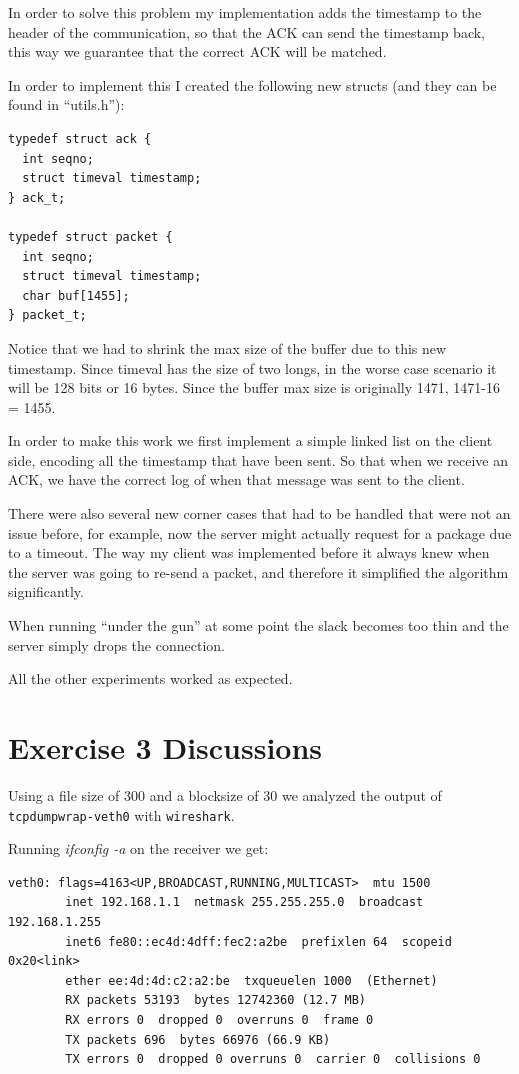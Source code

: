 \documentclass[paper=a4, fontsize=11pt]{scrartcl}
\numberwithin{equation}{section}		%
\numberwithin{figure}{section}			%
\numberwithin{table}{section}				%
\begin{document}
In order to solve this problem my implementation adds the timestamp
to the header of the communication, so that the ACK can send the timestamp
back, this way we guarantee that the correct ACK will be matched.

In order to implement this I created the following new structs (and they can be found in ``utils.h''):

\begin{lstlisting}
typedef struct ack {
  int seqno;
  struct timeval timestamp;
} ack_t;

typedef struct packet {
  int seqno;
  struct timeval timestamp;
  char buf[1455];
} packet_t;
\end{lstlisting}

Notice that we had to shrink the max size of the buffer due to this new
timestamp. Since timeval has the size of two longs, in the worse case scenario
it will be 128 bits or 16 bytes.
Since the buffer max size is originally 1471, 1471-16 = 1455.

In order to make this work we first implement a simple linked list
on the client side, encoding all the timestamp that have been sent.
So that when we receive an ACK, we have the correct log of when that message was
sent to the client.

There were also several new corner cases that had to be handled
that were not an issue before, for example, now the server
might actually request for a package due to a timeout.
The way my client was implemented before it always knew
when the server was going to re-send a packet, and therefore it
simplified the algorithm significantly.

When running ``under the gun'' at some point the slack becomes too thin and the server
simply drops the connection.

All the other experiments worked as expected.

\section{Exercise 3 Discussions}
Using a file size of 300 and a blocksize of 30 we analyzed the
output of \texttt{tcpdumpwrap-veth0} with \texttt{wireshark}.

Running \textit{ifconfig -a} on the receiver we get:
\begin{lstlisting}
veth0: flags=4163<UP,BROADCAST,RUNNING,MULTICAST>  mtu 1500
        inet 192.168.1.1  netmask 255.255.255.0  broadcast 192.168.1.255
        inet6 fe80::ec4d:4dff:fec2:a2be  prefixlen 64  scopeid 0x20<link>
        ether ee:4d:4d:c2:a2:be  txqueuelen 1000  (Ethernet)
        RX packets 53193  bytes 12742360 (12.7 MB)
        RX errors 0  dropped 0  overruns 0  frame 0
        TX packets 696  bytes 66976 (66.9 KB)
        TX errors 0  dropped 0 overruns 0  carrier 0  collisions 0
\end{lstlisting}
\end{document}

